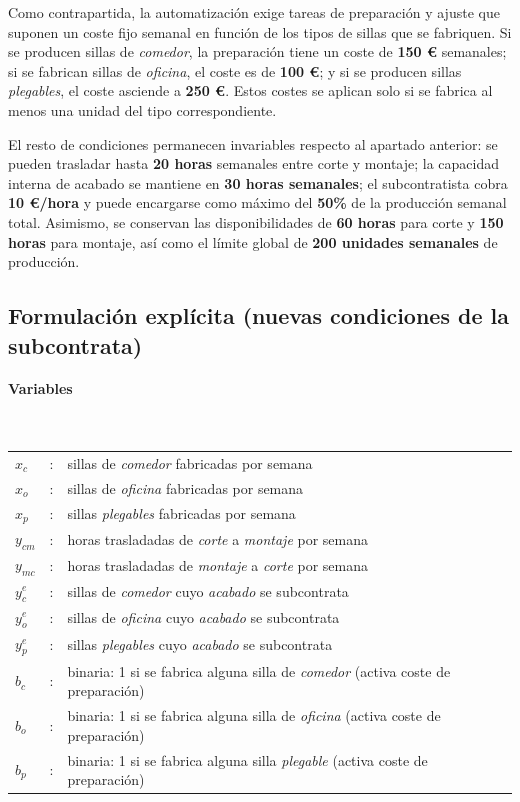 Como contrapartida, la automatización exige tareas de preparación y ajuste que suponen un coste fijo semanal en función de los tipos de sillas que se fabriquen. Si se producen sillas de \textit{comedor}, la preparación tiene un coste de \textbf{150 €} semanales; si se fabrican sillas de \textit{oficina}, el coste es de \textbf{100 €}; y si se producen sillas \textit{plegables}, el coste asciende a \textbf{250 €}. Estos costes se aplican solo si se fabrica al menos una unidad del tipo correspondiente.

El resto de condiciones permanecen invariables respecto al apartado anterior: se pueden trasladar hasta \textbf{20 horas} semanales entre corte y montaje; la capacidad interna de acabado se mantiene en \textbf{30 horas semanales}; el subcontratista cobra \textbf{10 €/hora} y puede encargarse como máximo del \textbf{50\%} de la producción semanal total. Asimismo, se conservan las disponibilidades de \textbf{60 horas} para corte y \textbf{150 horas} para montaje, así como el límite global de \textbf{200 unidades semanales} de producción.




\subsection{Formulación explícita (nuevas condiciones de la subcontrata)}

\paragraph{Variables}\mbox{}\\
\begin{tabular}{l c l}
    $x_c$  & : & sillas de \textit{comedor} fabricadas por semana \\
    $x_o$  & : & sillas de \textit{oficina} fabricadas por semana \\
    $x_p$  & : & sillas \textit{plegables} fabricadas por semana \\
    $y_{cm}$ & : & horas trasladadas de \textit{corte} a \textit{montaje} por semana \\
    $y_{mc}$ & : & horas trasladadas de \textit{montaje} a \textit{corte} por semana \\
    $y_c^{e}$ & : & sillas de \textit{comedor} cuyo \textit{acabado} se subcontrata \\
    $y_o^{e}$ & : & sillas de \textit{oficina} cuyo \textit{acabado} se subcontrata \\
    $y_p^{e}$ & : & sillas \textit{plegables} cuyo \textit{acabado} se subcontrata \\
    $b_c$ & : & binaria: 1 si se fabrica alguna silla de \textit{comedor} (activa coste de preparación) \\
    $b_o$ & : & binaria: 1 si se fabrica alguna silla de \textit{oficina} (activa coste de preparación) \\
    $b_p$ & : & binaria: 1 si se fabrica alguna silla \textit{plegable} (activa coste de preparación) \\
\end{tabular}

